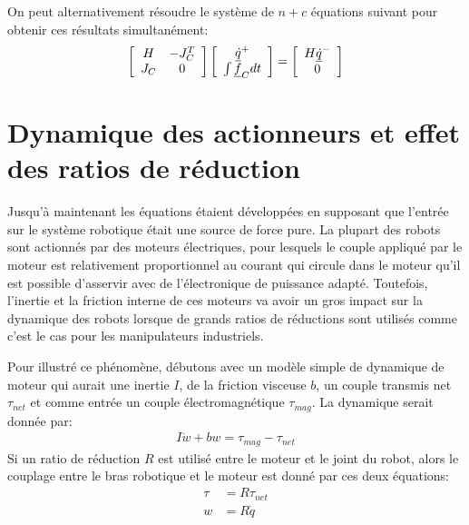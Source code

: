 On peut alternativement résoudre le système de $n+c$ équations suivant pour obtenir ces résultats simultanément:
\begin{align}
\left[ \begin{array}{c c } 	H & -J_C^T  \\ J_C 	& 0  	\end{array} \right] \left[ \begin{array}{c} \underline{\dot{q}}^+  \\ \int{ \underline{f}_C dt }\end{array} \right] = \left[ \begin{array}{c}  	H \underline{\dot{q}}^-   \\ 0  \end{array} \right]
\label{eq:manipulator_impact_eom}
\end{align}

\newpage
\section{Dynamique des actionneurs et effet des ratios de réduction}
\label{sec:actuatordynamic}

Jusqu'à maintenant les équations étaient développées en supposant que l'entrée sur le système robotique était une source de force pure. La plupart des robots sont actionnés par des moteurs électriques, pour lesquels le couple appliqué par le moteur est relativement proportionnel au courant qui circule dans le moteur qu'il est possible d'asservir avec de l'électronique de puissance adapté. Toutefois, l'inertie et la friction interne de ces moteurs va avoir un gros impact sur la dynamique des robots lorsque de grands ratios de réductions sont utilisés comme c'est le cas pour les manipulateurs industriels.

Pour illustré ce phénomène, débutons avec un modèle simple de dynamique de moteur qui aurait une inertie $I$, de la friction visceuse $b$, un couple transmis net $\tau_{net}$ et comme entrée un couple électromagnétique $\tau_{mag}$. La dynamique serait donnée par:
\begin{align}
I \dot{w} + b w  = \tau_{mag} - \tau_{net}
\end{align}
Si un ratio de réduction $R$ est utilisé entre le moteur et le joint du robot, alors le couplage entre le bras robotique et le moteur est donné par ces deux équations:
\begin{align}
\tau &= R \tau_{net} \\
 w   &= R \dot{q}
\end{align}

